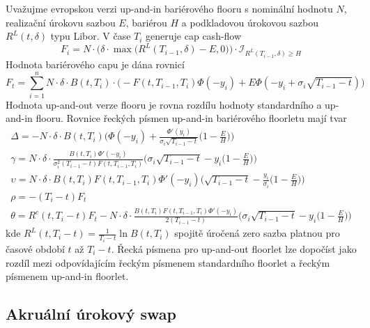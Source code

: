 \documentclass[a4paper]{book}
\begin{document}
Uvažujme evropskou verzi up-and-in bariérového flooru s nominální hodnotu $N$, realizační úrokovu sazbou $E$, bariérou $H$ a podkladovou úrokovou sazbou $R^L(t, \delta)$ typu Libor. V čase $T_i$ generuje cap cash-flow
\begin{equation*}
F_i = N \cdot \big( \delta \cdot \max \big( R^L(T_{i-1}, \delta) - E, 0 \big) \big) \cdot \mathcal{I}_{R^L(T_{i-1}, \delta) \ge H}
\end{equation*}
Hodnota bariérového capu je dána rovnicí
\begin{equation*}
F_t = \sum_{i=1}^n N \cdot \delta \cdot B(t, T_i) \cdot \big( -F(t, T_{i-1}, T_i)\Phi(-y_i) + E\Phi(-y_i + \sigma_i\sqrt{T_{i-1} -t })\big)
\end{equation*}
Hodnota up-and-out verze flooru je rovna rozdílu hodnoty standardního a up-and-in flooru. Rovnice řeckých písmen up-and-in bariérového floorletu mají tvar
\begin{gather*}
\Delta = -N \cdot \delta \cdot B(t, T_i) \Bigg( \Phi(-y_i) + \frac{\Phi'(y_i)}{\sigma_i \sqrt{T_{i-1} - t}} \Big(1 - \frac{E}{H} \Big) \Bigg)\\
\gamma = N \cdot \delta \cdot \frac{B(t, T_i)\Phi'(-y_i)}{\sigma_i^2(T_{i-1} - t)F(t, T_{i-1}, T_i)}\Bigg( \sigma_i \sqrt{T_{i-1} - t} - y_i \Big( 1 - \frac{E}{H} \Big) \Bigg)\\
\upsilon = N \cdot \delta \cdot B(t, T_i)F(t, T_{i-1}, T_i) \Phi'(-y_i) \Bigg( \sqrt{T_{i-1} - t} - \frac{y_i}{\sigma_i}\Big( 1 - \frac{E}{H} \Big) \Bigg)\\
\rho = -(T_i - t) F_t\\
\theta = R^c(t, T_i - t) F_t - N \cdot \delta \cdot \frac{B(t, T_i)F(t, T_{i-1}, T_i)\Phi'(-y_i)}{2(T_{i-1} - t)}\Bigg( \sigma_i \sqrt{T_{i-1} - t} - y_i \Big( 1 - \frac{E}{H} \Big) \Bigg)
\end{gather*}
kde $R^L(t, T_i - t) = \frac{1}{T_i - t} \ln B(t, T_i)$ spojitě úročená zero sazba platnou pro časové období $t$ až $T_i - t$. Řecká písmena pro up-and-out floorlet lze dopočíst jako rozdíl mezi odpovídajícím řeckým písmenem standardního floorlet a řeckým písmenem up-and-in floorlet.

\subsection{Akruální úrokový swap}
\end{document}
